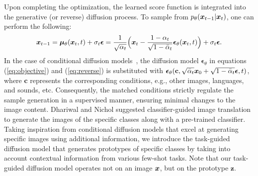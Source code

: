 Upon completing the optimization, the learned score function is integrated into the generative (or reverse) diffusion process. To sample from $p_\theta({\boldsymbol x}_{t-1}|{\boldsymbol x}_t)$, one can perform the following:
\begin{align}\label{eq:reverse}
    {\boldsymbol x}_{t-1}=   {\boldsymbol\mu}_\theta({\boldsymbol x}_t,t)+\sigma_t\boldsymbol{\epsilon}=\frac{1}{\sqrt{\alpha_t}}\Big{(}{\boldsymbol x}_t-\frac{1-\alpha_t}{\sqrt{1-\bar{\alpha}_t}}\boldsymbol{\epsilon}_\theta({\boldsymbol x}_t,t)\Big{)}+\sigma_t\boldsymbol{\epsilon}.
\end{align}
%
In the case of conditional diffusion models~\cite{kwon2022diffusion, saharia2022palette, sasaki2021unit}, the diffusion model $\boldsymbol{\epsilon}_\theta$ in equations (\ref{eq:objective}) and (\ref{eq:reverse}) is substituted with $\boldsymbol{\epsilon}_\theta(\mathbf{c}, \sqrt{\bar{\alpha}_t}{\boldsymbol x}_0 + \sqrt{1 - \bar{\alpha}_t}\boldsymbol{\epsilon}, t)$, where $\mathbf{c}$ represents the corresponding conditions, e.g., other images, languages, and sounds, etc.
Consequently, the matched conditions strictly regulate the sample generation in a supervised manner, ensuring minimal changes to the image content.
Dhariwal and Nichol \cite{dhariwal2021diffusion} suggested classifier-guided image translation to generate the images of the specific classes along with a pre-trained classifier.
Taking inspiration from conditional diffusion models that excel at generating specific images using additional information, we introduce the task-guided diffusion model that generates prototypes of specific classes by taking into account contextual information from various few-shot tasks. Note that our task-guided diffusion model operates not on an image ${\boldsymbol x}$, but on the prototype $\mathbf{z}$. 